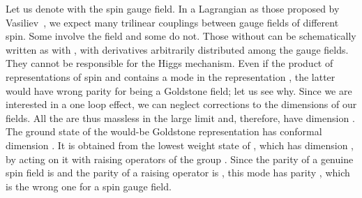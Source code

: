 \documentclass[a4paper,12pt]{article}
\begin{document}
Let us denote with \coordHE{} the spin \coordHE{} gauge
field.  In a Lagrangian as those proposed by Vasiliev~\cite{v}, we
expect many trilinear couplings between gauge fields of different
spin. Some involve the field \myHighlight{$\Sigma$}\coordHE{} and some do not. Those without
\myHighlight{$\Sigma$}\coordHE{} can be schematically written as \coordHE{} with \coordHE{}, with derivatives arbitrarily
distributed among the gauge fields. They cannot be responsible for the
Higgs mechanism. Even if the product of representations of spin \coordHE{}
and \coordHE{} contains a mode in the representation \coordHE{}, the
latter would have wrong parity for being a Goldstone field; let us see
why.  Since we are interested in a one loop effect, we can neglect
\coordHE{} corrections to the dimensions of our fields.  All the \coordHE{} are
thus massless in the large \coordHE{} limit and, therefore, have dimension
\coordHE{}.  The ground state of the would-be Goldstone representation has
conformal dimension \coordHE{}. It is obtained from the lowest weight state
of \coordHE{}, which has dimension \coordHE{}, by acting on it with
\coordHE{} raising operators of the group \coordHE{}.  Since the parity of a
genuine spin \coordHE{} field is \coordHE{} and the parity of a raising
operator is \coordHE{}, this mode has parity \coordHE{},
which is the wrong one for a spin \coordHE{} gauge field.
\end{document}
